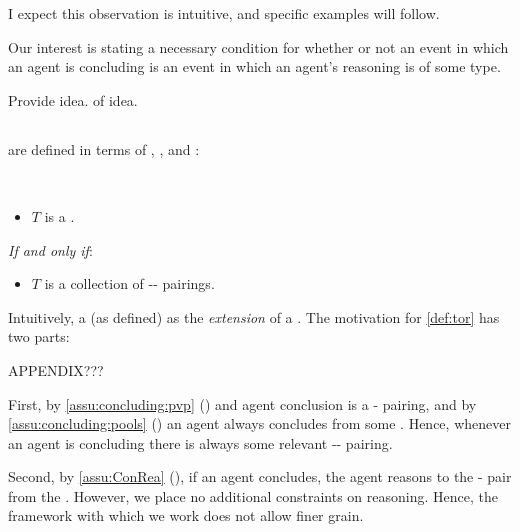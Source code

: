 \begin{note}
  I expect this observation is intuitive, and specific examples will follow.
\end{note}


\begin{note}
  Our interest is stating a necessary condition for whether or not an event in which an agent is concluding is an event in which an agent's reasoning is of some type.

  Provide idea.
   of idea.
\end{note}


\subsection{}
\label{cha:typical:tCDef:ToRdef}

\begin{note}
   are defined in terms of , , and :

  \begin{definition}[A \torN{0}]
    \label{def:tor}
    \mbox{ }
    \vspace{-\baselineskip}
    \begin{itemize}
    \item
      \(T\) is a \torN{}.
    \end{itemize}

    \emph{If and only if}:

    \begin{itemize}
    \item
      \(T\) is a collection of -- pairings.
    \end{itemize}
    \vspace{-\baselineskip}
  \end{definition}

  \noindent%
  Intuitively, a \torN{} (as defined) as the \emph{extension} of a \torN{}.
  The motivation for \autoref{def:tor} has two parts:

  {
    \color{blue}
    APPENDIX???
  }

  First, by \autoref{assu:concluding:pvp} () and agent conclusion is a - pairing, and by \autoref{assu:concluding:pools} () an agent always concludes from some \pool{}.
  Hence, whenever an agent is concluding there is always some relevant -- pairing.

  Second, by \autoref{assu:ConRea} (), if an agent concludes, the agent reasons to the - pair from the .
  However, we place no additional constraints on reasoning.
  Hence, the framework with which we work does not allow finer grain.
\end{note}

